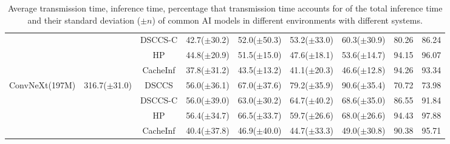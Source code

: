 \begin{table}[htb]
\begin{tabular}{ccc|c|c|c|c|c|c}
 &  & DSCCS-C & 42.7($\pm$30.2) & 52.0($\pm$50.3) & 53.2($\pm$33.0) & 60.3($\pm$30.9) & 80.26 & 86.24 \\
 &  & HP & 44.8($\pm$20.9) & 51.5($\pm$15.0) & 47.6($\pm$18.1) & 53.6($\pm$14.7) & 94.15 & 96.07 \\
 &  & CacheInf & 37.8($\pm$31.2) & 43.5($\pm$13.2) & 41.1($\pm$20.3) & 46.6($\pm$12.8) & 94.26 & 93.34 \\
\cline{1-9} \cline{2-9}
\multirow[c]{4}{*}{ConvNeXt(197M)} & \multirow[c]{4}{*}{316.7($\pm$31.0)} & DSCCS & 56.0($\pm$36.1) & 67.0($\pm$37.6) & 79.2($\pm$35.9) & 90.6($\pm$35.4) & 70.72 & 73.98 \\
 &  & DSCCS-C & 56.0($\pm$39.0) & 63.0($\pm$30.2) & 64.7($\pm$40.2) & 68.6($\pm$35.0) & 86.55 & 91.84 \\
 &  & HP & 56.4($\pm$34.7) & 66.5($\pm$33.7) & 59.7($\pm$26.6) & 68.0($\pm$26.6) & 94.43 & 97.88 \\
 &  & CacheInf & 40.4($\pm$37.8) & 46.9($\pm$40.0) & 44.7($\pm$33.3) & 49.0($\pm$30.8) & 90.38 & 95.71 \\
\cline{1-9} \cline{2-9}
\bottomrule
\end{tabular}


    \caption{Average transmission time, inference time, percentage that transmission time accounts for of the total inference time and their standard deviation ($\pm n$) of common AI models in different environments with different systems. }
    \label{tab:torchvision_time}
\end{table}

